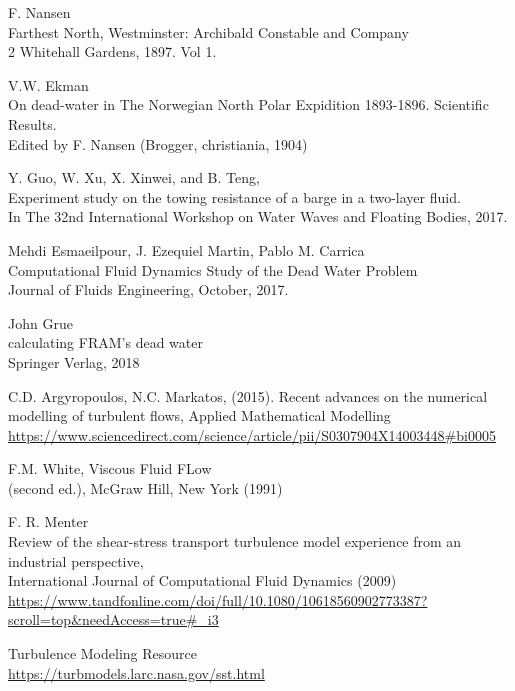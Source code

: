 \documentclass[a4paper, 12pt]{report}
\begin{document}
\begin{thebibliography}{9}
	F. Nansen\\
	Farthest North, Westminster: Archibald Constable and Company\\
	2 Whitehall Gardens, 1897. Vol 1.
	
	V.W. Ekman\\
	On dead-water in The Norwegian North Polar Expidition 1893-1896. Scientific Results.\\
	Edited by F. Nansen (Brogger, christiania, 1904)	
	
	Y. Guo, W. Xu, X. Xinwei, and B. Teng,\\
	Experiment study on the towing resistance of a barge in a
two-layer fluid.\\
	In The 32nd International Workshop on Water Waves and Floating Bodies, 2017.
	
	Mehdi Esmaeilpour, J. Ezequiel Martin, Pablo M. Carrica\\
	Computational Fluid Dynamics Study of the Dead Water Problem\\
	Journal of Fluids Engineering, October, 2017.
	
	John Grue\\
	calculating FRAM's dead water\\
	Springer Verlag, 2018
	
	C.D. Argyropoulos, N.C. Markatos, (2015).
	Recent advances on the numerical modelling of turbulent flows, Applied Mathematical Modelling \\
	\url{https://www.sciencedirect.com/science/article/pii/S0307904X14003448#bi0005}

	F.M. White,
	Viscous Fluid FLow \\
	(second ed.), McGraw Hill, New York (1991)
	
	 F. R. Menter \\ Review of the shear-stress transport turbulence model experience from an industrial perspective,\\
	International Journal of Computational Fluid Dynamics (2009)\\
	\url{https://www.tandfonline.com/doi/full/10.1080/10618560902773387?scroll=top&needAccess=true#_i3}
	
	Turbulence Modeling Resource \\
	\url{https://turbmodels.larc.nasa.gov/sst.html}


\end{thebibliography}
\end{document}
